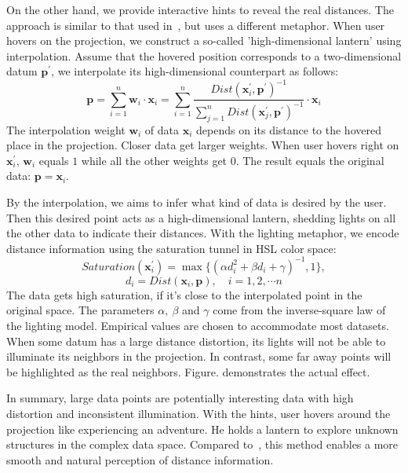 On the other hand, we provide interactive hints to reveal the real distances. The approach is similar to that used in~\cite{DBLP:journals/tvcg/StahnkeDMT16}, but uses a different metaphor. When user hovers on the projection, we construct a so-called 'high-dimensional lantern' using interpolation. Assume that the hovered position corresponds to a two-dimensional datum $\mathbf{p}^{\prime}$, we interpolate its high-dimensional counterpart as follows:
$$\mathbf{p} = \sum\limits_{i=1}^{n}\mathbf{w}_{i}\cdot\mathbf{x}_{i} =  \sum\limits_{i=1}^{n}\frac{Dist(\mathbf{x}_{i}^{\prime}, \mathbf{p}^{\prime})^{-1}}{\sum\limits_{j=1}^{n}Dist(\mathbf{x}_{j}^{\prime}, \mathbf{p}^{\prime})^{-1}}\cdot\mathbf{x}_{i}$$
The interpolation weight $\mathbf{w}_{i}$ of data $\mathbf{x}_{i}$ depends on its distance to the hovered place in the projection. Closer data get larger weights. When user hovers right on $\mathbf{x}_{i}^{\prime}$, $\mathbf{w}_{i}$ equals $1$ while all the other weights get $0$. The result equals the original data: $\mathbf{p} = \mathbf{x}_{i}$.

By the interpolation, we aims to infer what kind of data is desired by the user. Then this desired point acts as a high-dimensional lantern, shedding lights on all the other data to indicate their distances. With the lighting metaphor, we encode distance information using the saturation tunnel in HSL color space:
$$Saturation(\mathbf{x}_{i}^{\prime}) = \max{\{(\alpha d_{i}^{2} + \beta d_{i} + \gamma)^{-1}, 1\}},$$
$$d_{i} = Dist(\mathbf{x}_{i}, \mathbf{p}), \quad i = 1,2,\cdots n$$
The data gets high saturation, if it's close to the interpolated point in the original space. The parameters $\alpha,\ \beta$ and $\gamma$ come from the inverse-square law of the lighting model. Empirical values are chosen to accommodate most datasets. When some datum has a large distance distortion, its lights will not be able to illuminate its neighbors in the projection. In contrast, some far away points will be highlighted as the real neighbors. Figure. demonstrates the actual effect. 

In summary, large data points are potentially interesting data with high distortion and inconsistent illumination. With the hints, user hovers around the projection like experiencing an adventure. He holds a lantern to explore unknown structures in the complex data space. Compared to~\cite{DBLP:journals/tvcg/StahnkeDMT16}, this method enables a more smooth and natural perception of distance information.

